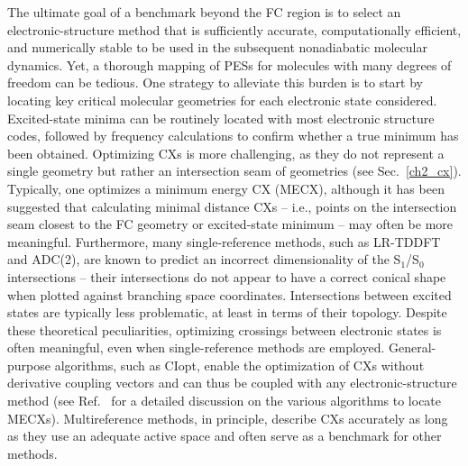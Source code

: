 \documentclass[9pt,bestpractices]{livecoms}
\begin{document}
The ultimate goal of a benchmark beyond the FC region is to select an electronic-structure method that is sufficiently accurate, computationally efficient, and numerically stable to be used in the subsequent nonadiabatic molecular dynamics. Yet, a thorough mapping of PESs for molecules with many degrees of freedom can be tedious. One strategy to alleviate this burden is to start by locating key critical molecular geometries for each electronic state considered. Excited-state minima can be routinely located with most electronic structure codes, followed by frequency calculations to confirm whether a true minimum has been obtained. Optimizing CXs is more challenging, as they do not represent a single geometry but rather an intersection seam of geometries (see Sec.~\ref{ch2_cx}).\cite{pieri2021namdreactor} Typically, one optimizes a minimum energy CX (MECX), although it has been suggested that calculating minimal distance CXs -- i.e., points on the intersection seam closest to the FC geometry or excited-state minimum -- may often be more meaningful.\cite{levine2008optimizing} Furthermore, many single-reference methods, such as LR-TDDFT and ADC(2), are known to predict an incorrect dimensionality of the S$_1$/S$_0$ intersections -- their intersections do not appear to have a correct conical shape when plotted against branching space coordinates.\cite{tuna2015assessment,taylor2023description} Intersections between excited states are typically less problematic, at least in terms of their topology. Despite these theoretical peculiarities, optimizing crossings between electronic states is often meaningful, even when single-reference methods are employed.\cite{taylor2023description} General-purpose algorithms, such as CIopt,\cite{levine2008optimizing} enable the optimization of CXs without derivative coupling vectors and can thus be coupled with any electronic-structure method (see Ref.~ for a detailed discussion on the various algorithms to locate MECXs).  Multireference methods, in principle, describe CXs accurately as long as they use an adequate active space and often serve as a benchmark for other methods.
\end{document}

